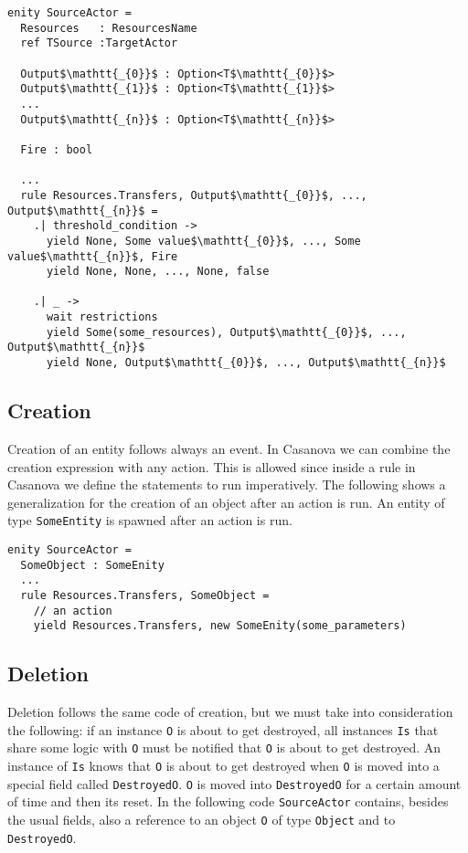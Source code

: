 \begin{lstlisting}
enity SourceActor =
  Resources   : ResourcesName
  ref TSource :TargetActor

  Output$\mathtt{_{0}}$ : Option<T$\mathtt{_{0}}$>
  Output$\mathtt{_{1}}$ : Option<T$\mathtt{_{1}}$>
  ...
  Output$\mathtt{_{n}}$ : Option<T$\mathtt{_{n}}$>
  
  Fire : bool
  
  ...
  rule Resources.Transfers, Output$\mathtt{_{0}}$, ..., Output$\mathtt{_{n}}$ = 
    .| threshold_condition ->
      yield None, Some value$\mathtt{_{0}}$, ..., Some value$\mathtt{_{n}}$, Fire
      yield None, None, ..., None, false
      
    .| _ ->    
      wait restrictions
      yield Some(some_resources), Output$\mathtt{_{0}}$, ..., Output$\mathtt{_{n}}$
      yield None, Output$\mathtt{_{0}}$, ..., Output$\mathtt{_{n}}$
\end{lstlisting}

\subsection{Creation}
Creation of an entity follows always an event. In Casanova we can combine the creation expression with any action. This is allowed since inside a rule in Casanova we define the statements to run imperatively. The following shows a generalization for the creation of an object after an action is run. An entity of type \texttt{SomeEntity} is spawned after an action is run.

\begin{lstlisting}
enity SourceActor =
  SomeObject : SomeEnity
  ...
  rule Resources.Transfers, SomeObject =
    // an action
    yield Resources.Transfers, new SomeEnity(some_parameters)
\end{lstlisting}

\subsection{Deletion}
Deletion follows the same code of creation, but we must take into consideration the following: if an instance \texttt{O} is about to get destroyed, all instances \texttt{Is} that share some logic with \texttt{O} must be notified that \texttt{O} is about to get destroyed. An instance of \texttt{Is} knows that \texttt{O} is about to get destroyed when \texttt{O} is moved into a special field called \texttt{DestroyedO}. \texttt{O} is moved into \texttt{DestroyedO} for a certain amount of time and then its reset. In the following code \texttt{SourceActor} contains, besides the usual fields, also a reference to an object \texttt{O} of type \texttt{Object} and to \texttt{DestroyedO}.

